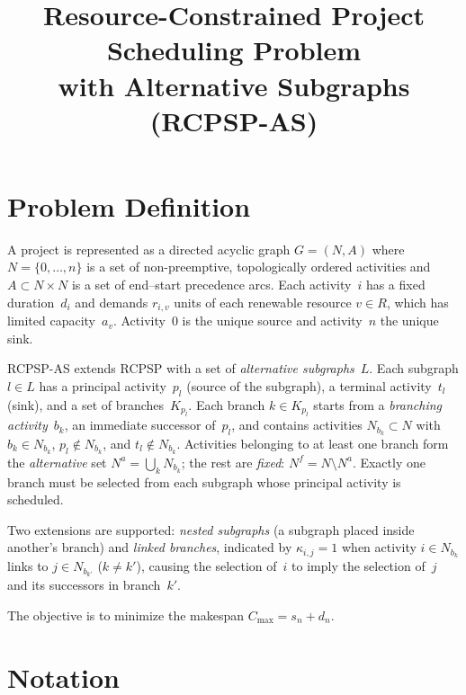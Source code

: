 \documentclass{article}
\title{Resource-Constrained Project Scheduling Problem \\ with Alternative Subgraphs (RCPSP-AS)}
\author{}
\date{}
\begin{document}
\maketitle

\section{Problem Definition}

A project is represented as a directed acyclic graph $G = (N, A)$ where $N = \{0, \ldots, n\}$ is a set of non-preemptive, topologically ordered activities and $A \subset N \times N$ is a set of end--start precedence arcs. Each activity~$i$ has a fixed duration~$d_i$ and demands $r_{i,v}$ units of each renewable resource $v \in R$, which has limited capacity~$a_v$. Activity~$0$ is the unique source and activity~$n$ the unique sink.

RCPSP-AS extends RCPSP with a set of \emph{alternative subgraphs}~$L$. Each subgraph $l \in L$ has a principal activity~$p_l$ (source of the subgraph), a terminal activity~$t_l$ (sink), and a set of branches~$K_{p_l}$. Each branch $k \in K_{p_l}$ starts from a \emph{branching activity}~$b_k$, an immediate successor of~$p_l$, and contains activities $N_{b_k} \subset N$ with $b_k \in N_{b_k}$, $p_l \notin N_{b_k}$, and $t_l \notin N_{b_k}$. Activities belonging to at least one branch form the \emph{alternative} set $N^a = \bigcup_k N_{b_k}$; the rest are \emph{fixed}: $N^f = N \setminus N^a$. Exactly one branch must be selected from each subgraph whose principal activity is scheduled.

Two extensions are supported: \emph{nested subgraphs} (a subgraph placed inside another's branch) and \emph{linked branches}, indicated by $\kappa_{i,j} = 1$ when activity $i \in N_{b_k}$ links to $j \in N_{b_{k'}}$ ($k \neq k'$), causing the selection of~$i$ to imply the selection of~$j$ and its successors in branch~$k'$.

The objective is to minimize the makespan $C_{\max} = s_n + d_n$.

\section{Notation}
\end{document}
